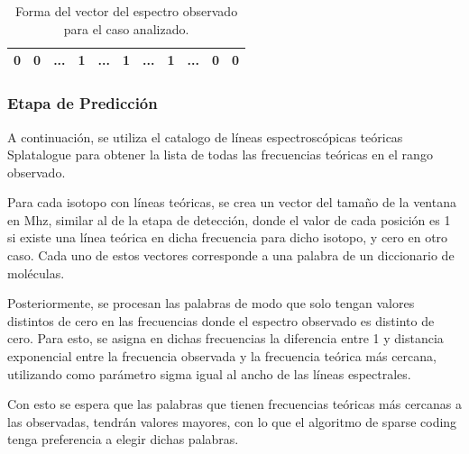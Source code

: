 \begin {table}[H]
\begin{center}
	\begin{tabular}{|c|c|c|c|c|c|c|c|c|c|c|}
		\hline 0 & 0 &  ... &  1 & ... &  1 & ... & 1 & ... & 0 & 0 \\ 
		\hline
	\end{tabular}
	\caption {Forma del vector del espectro observado para el caso analizado.}
\end{center}
\end{table}

\subsubsection{Etapa de Predicción}

A continuación, se utiliza el catalogo de líneas espectroscópicas teóricas Splatalogue para obtener la lista de todas las frecuencias teóricas en el rango observado.

Para cada isotopo con líneas teóricas, se crea un vector del tamaño de la ventana en Mhz, similar al de la etapa de detección, donde el valor de cada posición es 1 si existe una línea teórica en dicha frecuencia para dicho isotopo, y cero en otro caso. Cada uno de estos vectores corresponde a una palabra de un diccionario de moléculas.

Posteriormente, se procesan las palabras de modo que solo tengan valores distintos de cero en las frecuencias donde el espectro observado es distinto de cero. Para esto, se asigna en dichas frecuencias la diferencia entre 1 y distancia exponencial entre la frecuencia observada y la frecuencia teórica más cercana, utilizando como parámetro sigma igual al ancho de las líneas espectrales.

Con esto se espera que las palabras que tienen frecuencias teóricas más cercanas a las observadas, tendrán valores mayores, con lo que el algoritmo de sparse coding tenga preferencia a elegir dichas palabras.

